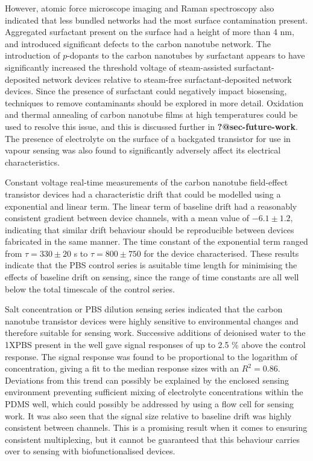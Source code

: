 \documentclass[
  a4paper,
]{scrbook}
\begin{document}
However, atomic force microscope imaging and Raman spectroscopy also
indicated that less bundled networks had the most surface contamination
present. Aggregated surfactant present on the surface had a height of
more than 4 nm, and introduced significant defects to the carbon
nanotube network. The introduction of \(p\)-dopants to the carbon
nanotubes by surfactant appears to have significantly increased the
threshold voltage of steam-assisted surfactant-deposited network devices
relative to steam-free surfactant-deposited network devices. Since the
presence of surfactant could negatively impact biosensing, techniques to
remove contaminants should be explored in more detail. Oxidation and
thermal annealing of carbon nanotube films at high temperatures could be
used to resolve this issue, and this is discussed further in
\textbf{?@sec-future-work}. The presence of electrolyte on the surface
of a backgated transistor for use in vapour sensing was also found to
significantly adversely affect its electrical characteristics.

Constant voltage real-time measurements of the carbon nanotube
field-effect transistor devices had a characteristic drift that could be
modelled using a exponential and linear term. The linear term of
baseline drift had a reasonably consistent gradient between device
channels, with a mean value of \(-6.1 \pm 1.2\), indicating that similar
drift behaviour should be reproducible between devices fabricated in the
same manner. The time constant of the exponential term ranged from
\(\tau = 330 \pm 20\) s to \(\tau = 800 \pm 750\) for the device
characterised. These results indicate that the PBS control series is
asuitable time length for minimising the effects of baseline drift on
sensing, since the range of time constants are all well below the total
timescale of the control series.

Salt concentration or PBS dilution sensing series indicated that the
carbon nanotube transistor devices were highly sensitive to
environmental changes and therefore suitable for sensing work.
Successive additions of deionised water to the 1XPBS present in the well
gave signal responses of up to 2.5 \% above the control response. The
signal response was found to be proportional to the logarithm of
concentration, giving a fit to the median response sizes with an
\(R^2 = 0.86\). Deviations from this trend can possibly be explained by
the enclosed sensing environment preventing sufficient mixing of
electrolyte concentrations within the PDMS well, which could possibly be
addressed by using a flow cell for sensing work. It was also seen that
the signal size relative to baseline drift was highly consistent between
channels. This is a promising result when it comes to ensuring
consistent multiplexing, but it cannot be guaranteed that this behaviour
carries over to sensing with biofunctionalised devices.
\end{document}
